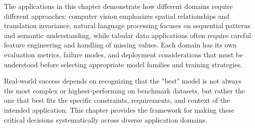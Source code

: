The applications in this chapter demonstrate how different domains require different approaches: computer vision emphasizes spatial relationships and translation invariance, natural language processing focuses on sequential patterns and semantic understanding, while tabular data applications often require careful feature engineering and handling of missing values. Each domain has its own evaluation metrics, failure modes, and deployment considerations that must be understood before selecting appropriate model families and training strategies.

Real-world success depends on recognizing that the "best" model is not always the most complex or highest-performing on benchmark datasets, but rather the one that best fits the specific constraints, requirements, and context of the intended application. This chapter provides the framework for making these critical decisions systematically across diverse application domains.








% 




